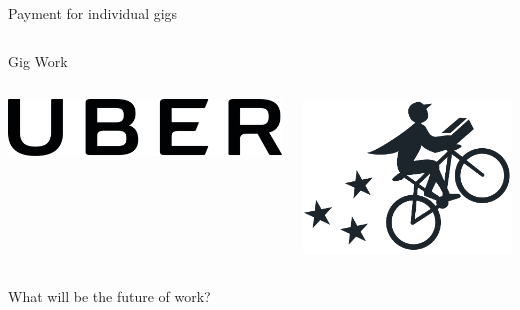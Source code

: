 \documentclass[presentation]{subfiles}
\begin{document}
\begin{frame}[t]{Payment for individual gigs}
\begin{columns}[b]
      \begin{column}[t]{0.45\textwidth}
        \centering
        Gig Work
        \begin{columns}
          \begin{column}{.5\textwidth}
            \includegraphics[max width=\linewidth,max height=\textheight,keepaspectratio]{../common_figures/uber.png}
          \end{column}
          \begin{column}{.5\textwidth}
            \includegraphics[max width=\linewidth,max height=\textheight,keepaspectratio]{../common_figures/postmates.png}
          \end{column}
        \end{columns}
      \end{column}
    \end{columns}
\end{frame}


\begin{frame}[standout]
    What will be the future of work?
\end{frame}
\end{document}
